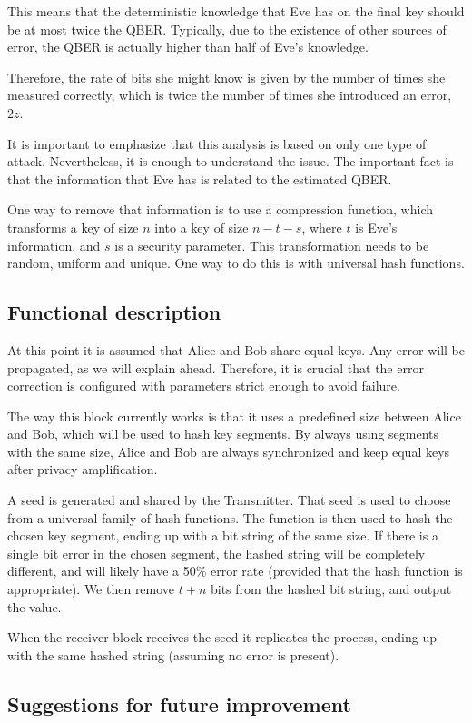 This means that the deterministic knowledge that Eve has on the final key should
be at most twice the QBER. Typically, due to the existence of other sources of
error, the QBER is actually higher than half of Eve's knowledge.

Therefore, the rate of bits she might know is given by the
number of times she measured correctly, which is twice the number of times she
introduced an error, $2z$.

It is important to emphasize that this analysis is based on only one type of
attack. Nevertheless, it is enough to understand the issue. The important fact
is that the information that Eve has is related to the estimated QBER.

One way to remove that information is to use a compression function, which
transforms a key of size $n$ into a key of size $n - t - s$, where $t$ is Eve's
information, and $s$ is a security parameter. This transformation needs to be
random, uniform and unique. One way to do this is with universal hash functions.

\subsection*{Functional description}
At this point it is assumed that Alice and Bob share equal keys. Any error will
be propagated, as we will explain ahead. Therefore, it is crucial that the error
correction is configured with parameters strict enough to avoid failure.

The way this block currently works is that it uses a predefined size between Alice and
Bob, which will be used to hash key segments. By always using segments with the
same size, Alice and Bob are always synchronized and keep equal keys after
privacy amplification.

A seed is generated and shared by the Transmitter. That seed is used to
choose from a universal family of hash functions. The function is then used to
hash the chosen key segment, ending up with a bit string of the same size.
If there is a single bit error in the chosen segment, the hashed string will be
completely different, and will likely have a 50\% error rate (provided that the
hash function is appropriate). We then remove $t+n$ bits from the hashed bit
string, and output the value.

When the receiver block receives the seed it replicates the process, ending up
with the same hashed string (assuming no error is present).


\subsection*{Suggestions for future improvement}


